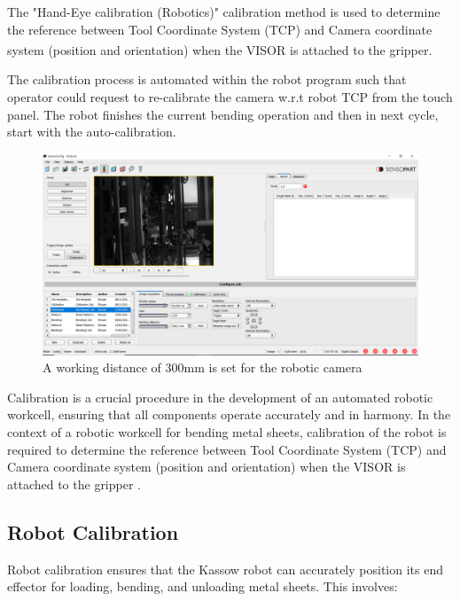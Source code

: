 The "Hand-Eye calibration (Robotics)" calibration method is used to determine the
reference between Tool Coordinate System (TCP) and Camera coordinate system
(position and orientation) when the VISOR\textsuperscript{\textregistered} is attached to the gripper.
\cite[page 102]{visor_user_manual}

The calibration process is automated within the robot program
such that operator could request to re-calibrate the camera w.r.t
robot TCP from the touch panel. The robot finishes the current
bending operation and then in next cycle, start with the auto-calibration.

\begin{figure}[h]
    \centering
    \includegraphics[width=\textwidth]{6. System Integration and Testing/6.2 Calibration Procedures/shutter_speed.PNG}
    \caption{A working distance of 300mm is set for the robotic camera}
    \label{fig:working-distance}
\end{figure}


Calibration is a crucial procedure in the development of 
an automated robotic workcell, ensuring that all components
operate accurately and in harmony. In the context of a
robotic workcell for bending metal sheets, calibration 
of the robot is required to determine the
reference between Tool Coordinate System (TCP) and
Camera coordinate system
(position and orientation) when the VISOR is attached
to the gripper
.\subsection{Robot Calibration}
Robot calibration ensures that the Kassow robot can accurately position its end effector for loading, bending, and unloading metal sheets. This involves:

